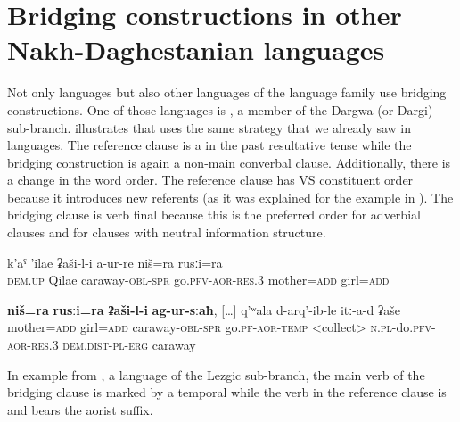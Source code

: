\documentclass[output=paper]{LSP/langsci}
\begin{document}
\section{Bridging constructions in other Nakh-Daghestanian languages}
\label{sec:Bridging constructions in other Nakh-Daghestanian languages}
Not only  languages but also other languages of the  language family use bridging constructions. One of those languages is , a member of the Dargwa (or Dargi) sub-branch.  illustrates that  uses the same strategy that we already saw in  languages. The reference clause is a  in the past resultative tense while the bridging construction is again a non-main converbal clause. Additionally, there is a change in the word order. The reference clause has VS constituent order because it introduces new referents (as it was explained for the  example in ). The bridging clause is verb final because this is the preferred order for adverbial clauses and for clauses with neutral information structure.

\begin{exe}
	\ex	\label{ex:27ab}
	\begin{xlist}
		\ex	\label{ex:27a}
		\gll	\underline{k’aˤ}	\underline{’ilae}	\underline{ʡaši-l-i}	\underline{a-ur-re}	\underline{niš=ra} \underline{rusːi=ra}\\
			\textsc{dem.up}	Qilae	caraway-\textsc{obl-spr}	go.\textsc{pfv-aor-res.3}	mother=\textsc{add} girl=\textsc{add}\\
		\glt	{}

		\ex	\label{ex:27b}
		\gll	\textbf{niš=ra}	\textbf{rusːi=ra}	\textbf{ʡaši-l-i}	\textbf{ag-ur-sːaħ},	[…] q’ʷala	d-arq’-ib-le	itː-a-d	ʡaše \\
			mother=\textsc{add}	girl=\textsc{add}	 caraway-\textsc{obl-spr} 	go.\textsc{pf-aor-temp} \phantom{x} <collect>	\textsc{n.pl}-do.\textsc{pfv-aor-res.3}	\textsc{dem.dist-pl-erg}	caraway\\
		\glt	{} 
	\end{xlist}
\end{exe}

In example  from , a language of the Lezgic sub-branch, the main verb of the bridging clause is marked by a temporal  while the verb in the reference clause is  and bears the aorist suffix. 
\end{document}
